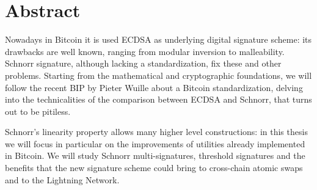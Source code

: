 \chapter{Abstract}
\label{chpr:abstract}
Nowadays in Bitcoin it is used ECDSA as underlying digital signature scheme: its drawbacks are well known, ranging from modular inversion to malleability. Schnorr signature, although lacking a standardization, fix these and other problems. Starting from the mathematical and cryptographic foundations, we will follow the recent BIP by Pieter Wuille about a Bitcoin standardization, delving into the technicalities of the comparison between ECDSA and Schnorr, that turns out to be pitiless.

\bigskip
\noindent
Schnorr's linearity property allows many higher level constructions: in this thesis we will focus in particular on the improvements of utilities already implemented in Bitcoin. We will study Schnorr multi-signatures, threshold signatures and the benefits that the new signature scheme could bring to cross-chain atomic swaps and to the Lightning Network.

